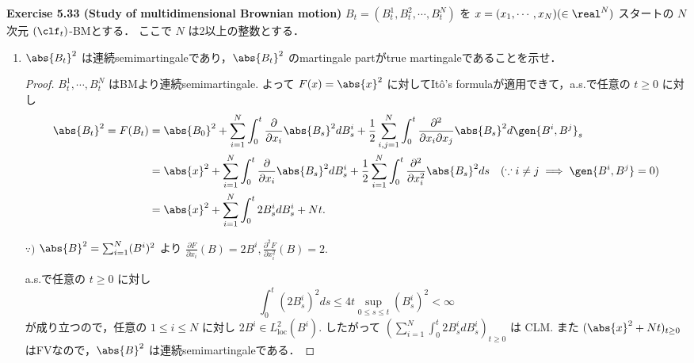 \documentclass{jsarticle}
\begin{document}
\textbf{Exercise 5.33 (Study of multidimensional Brownian motion)}
$B_t=(B_t^{1},B_t^{2},\dotsb,B_t^{N})$ を $x=(x_1,\dotsb,x_N)(\in\real^N)$ スタートの $N$ 次元 $(\clf_t)$-BMとする．
ここで $N$ は2以上の整数とする．
\begin{enumerate}
    \item
    $\abs{B_t}^2$ は連続semimartingaleであり，$\abs{B_t}^2$ のmartingale partがtrue martingaleであることを示せ．
    \begin{proof}
        $B_t^{1},\dotsb,B_t^{N}$ はBMより連続semimartingale.
        よって $F(x)=\abs{x}^2$ に対してIt\^{o}'s formulaが適用できて，a.s.で任意の $t\ge0$ に対し
        \begin{align}
            \abs{B_t}^2
            = F(B_t)
            &= \abs{B_0}^2
            + \sum_{i=1}^{N}\int_{0}^{t}\frac{\partial}{\partial x_i}\abs{B_s}^2 dB_s^i
            + \frac{1}{2}\sum_{i,j=1}^{N}\int_{0}^{t}\frac{\partial^2}{\partial x_i\partial x_j}\abs{B_s}^2 d\gen{B^i,B^j}_s \\
            &= \abs{x}^2
            + \sum_{i=1}^{N}\int_{0}^{t}\frac{\partial}{\partial x_i}\abs{B_s}^2 dB_s^i
            + \frac{1}{2}\sum_{i=1}^{N}\int_{0}^{t}\frac{\partial^2}{\partial x_i^2}\abs{B_s}^2 ds
            \quad(\because i\neq j\implies\gen{B^i,B^j}=0)\\
            &= \abs{x}^2
            + \sum_{i=1}^{N}\int_{0}^{t}2B_s^i dB_s^i
            + Nt.
        \end{align}
        \begin{screen}
            $\because)$ $\abs{B}^2=\sum_{i=1}^{N}(B^i)^2$ より $\frac{\partial F}{\partial x_i}(B)=2B^i, \frac{\partial^2 F}{\partial x_i^2}(B)=2.$
        \end{screen}

        a.s.で任意の $t\ge0$ に対し
        $$
        \int_{0}^{t}(2B_s^i)^2 ds
        \le 4t\sup_{0\le s\le t}(B_s^i)^2
        < \infty
        $$
        が成り立つので，任意の $1\le i\le N$ に対し $2B^i\in L_{\mathrm{loc}}^2(B^i).$
        したがって $(\sum_{i=1}^{N}\int_{0}^{t}2B_s^i dB_s^i)_{t\ge0}$ は CLM.
        また $(\abs{x}^2+Nt)_{t\ge0}$ はFVなので，$\abs{B}^2$ は連続semimartingaleである．


\end{proof}
\end{enumerate}
\end{document}
